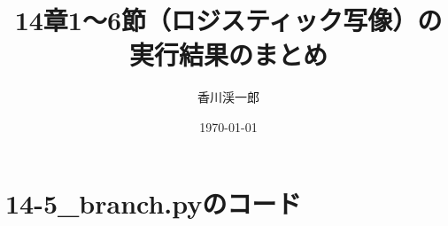 \documentclass[a4paper, oneside]{jsarticle}
\begin{document}
\title{14章1〜6節（ロジスティック写像）の実行結果のまとめ}
\author{香川渓一郎}
\date{\today}

\maketitle

\setcounter{tocdepth}{1}
\tableofcontents

\section{14-5\_branch.pyのコード}

\begin{lstlisting}[caption=14-5\_branch.py, label=branch]
  
\end{lstlisting}
\end{document}
